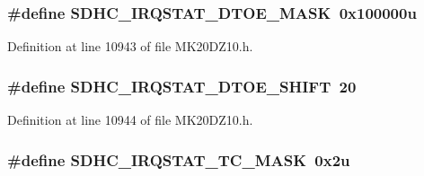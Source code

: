 \subsubsection[{\texorpdfstring{S\+D\+H\+C\+\_\+\+I\+R\+Q\+S\+T\+A\+T\+\_\+\+D\+T\+O\+E\+\_\+\+M\+A\+SK}{SDHC_IRQSTAT_DTOE_MASK}}]{\setlength{\rightskip}{0pt plus 5cm}\#define S\+D\+H\+C\+\_\+\+I\+R\+Q\+S\+T\+A\+T\+\_\+\+D\+T\+O\+E\+\_\+\+M\+A\+SK~0x100000u}\hypertarget{group___s_d_h_c___register___masks_ga1ddb5beb552cdc6193ebf649a9279bf9}{}\label{group___s_d_h_c___register___masks_ga1ddb5beb552cdc6193ebf649a9279bf9}


Definition at line 10943 of file M\+K20\+D\+Z10.\+h.

\subsubsection[{\texorpdfstring{S\+D\+H\+C\+\_\+\+I\+R\+Q\+S\+T\+A\+T\+\_\+\+D\+T\+O\+E\+\_\+\+S\+H\+I\+FT}{SDHC_IRQSTAT_DTOE_SHIFT}}]{\setlength{\rightskip}{0pt plus 5cm}\#define S\+D\+H\+C\+\_\+\+I\+R\+Q\+S\+T\+A\+T\+\_\+\+D\+T\+O\+E\+\_\+\+S\+H\+I\+FT~20}\hypertarget{group___s_d_h_c___register___masks_gac0dd3b95df6da3006bb082622a655b37}{}\label{group___s_d_h_c___register___masks_gac0dd3b95df6da3006bb082622a655b37}


Definition at line 10944 of file M\+K20\+D\+Z10.\+h.

\subsubsection[{\texorpdfstring{S\+D\+H\+C\+\_\+\+I\+R\+Q\+S\+T\+A\+T\+\_\+\+T\+C\+\_\+\+M\+A\+SK}{SDHC_IRQSTAT_TC_MASK}}]{\setlength{\rightskip}{0pt plus 5cm}\#define S\+D\+H\+C\+\_\+\+I\+R\+Q\+S\+T\+A\+T\+\_\+\+T\+C\+\_\+\+M\+A\+SK~0x2u}\hypertarget{group___s_d_h_c___register___masks_ga185e91bcbd3342825308183528069025}{}\label{group___s_d_h_c___register___masks_ga185e91bcbd3342825308183528069025}


